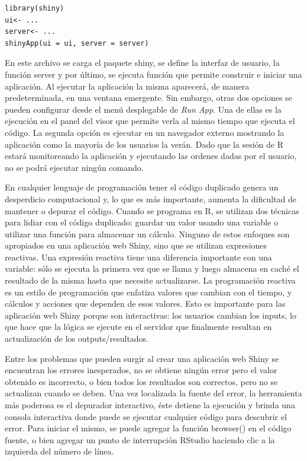 \begin{lstlisting}
library(shiny)
ui<- ...
server<- ...
shinyApp(ui = ui, server = server)
\end{lstlisting}

En este archivo se carga el paquete shiny, se define la interfaz de usuario, la función server y por último, se ejecuta función que permite construir e iniciar una aplicación. Al ejecutar la aplicación la misma aparecerá, de manera predeterminada, en una ventana emergente. Sin embargo, otras dos opciones se pueden configurar desde el menú desplegable de \emph{Run App}. Una de ellas es la ejecución en el panel del visor que permite verla al mismo tiempo que ejecuta el código. La segunda opción es ejecutar en un navegador externo mostrando la aplicación como la mayoría de los usuarios la verán. Dado que la sesión de R estará monitoreando la aplicación y ejecutando las ordenes dadas por el usuario, no se podrá ejecutar ningún comando.

En cualquier lenguaje de programación tener el código duplicado genera un desperdicio computacional y, lo que es más importante, aumenta la dificultad de mantener o depurar el código. Cuando se programa en R, se utilizan dos técnicas para lidiar con el código duplicado: guardar un valor usando una variable o utilizar una función para almacenar un cálculo. Ninguno de estos enfoques son apropiados en una aplicación web Shiny, sino que se utilizan expresiones reactivas. Una expresión reactiva tiene una diferencia importante con una variable: sólo se ejecuta la primera vez que se llama y luego almacena en caché el resultado de la misma hasta que necesite actualizarse. La programación reactiva es un estilo de programación que enfatiza valores que cambian con el tiempo, y cálculos y acciones que dependen de esos valores. Esto es importante para las aplicación web Shiny porque son interactivas: los usuarios cambian los inputs, lo que hace que la lógica se ejecute en el servidor que finalmente resultan en actualización de los outputs/resultados.

Entre los problemas que pueden surgir al crear una aplicación web Shiny se encuentran los errores inesperados, no se obtiene ningún error pero el valor obtenido es incorrecto, o bien todos los resultados son correctos, pero no se actualizan cuando se deben. Una vez localizada la fuente del error, la herramienta más poderosa es el depurador interactivo, éste detiene la ejecución y brinda una consola interactiva donde puede se ejecutar cualquier código para descubrir el error. Para iniciar el mismo, se puede agregar la función browser() en el código fuente, o bien agregar un punto de interrupción RStudio haciendo clic a la izquierda del número de línea.

